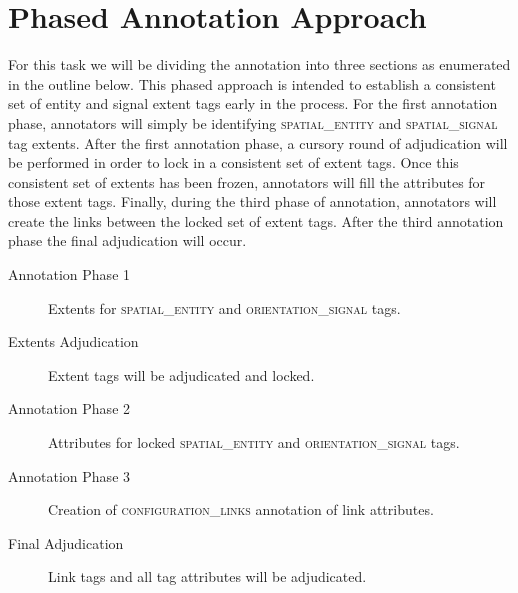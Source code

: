 \documentclass[11pt]{article}
\begin{document}

\section{Phased Annotation Approach} %
\label{sec:phased_annotation_approach}

For this task we will be dividing the annotation into three sections as enumerated in the outline below. This phased approach is intended to establish a consistent set of entity and signal extent tags early in the process. For the first annotation phase, annotators will simply be identifying \textsc{spatial\_entity} and \textsc{spatial\_signal} tag extents. After the first annotation phase, a cursory round of adjudication will be performed in order to lock in a consistent set of extent tags. Once this consistent set of extents has been frozen, annotators will fill the attributes for those extent tags. Finally, during the third phase of annotation, annotators will create the links between the locked set of extent tags. After the third annotation phase the final adjudication will occur.

\begin{description}
    \item[Annotation Phase 1] Extents for \textsc{spatial\_entity} and \textsc{orientation\_signal} tags.
    \item[Extents Adjudication] Extent tags will be adjudicated and locked.
    \item[Annotation Phase 2] Attributes for locked \textsc{spatial\_entity} and \textsc{orientation\_signal} tags.
    \item[Annotation Phase 3] Creation of \textsc{configuration\_links} annotation of link attributes.
    \item[Final Adjudication] Link tags and all tag attributes will be adjudicated.
\end{description}
\label{desc:phases}


\end{document}
